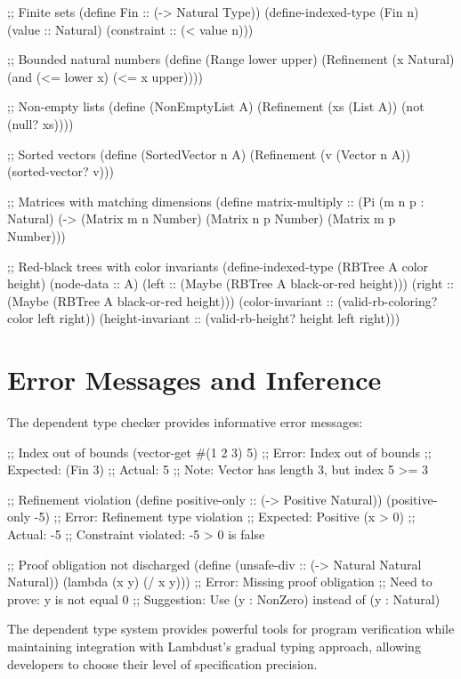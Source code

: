 \begin{example}
\begin{lambdustcode}
;; Finite sets
(define Fin :: (-> Natural Type))
(define-indexed-type (Fin n)
  (value :: Natural)
  (constraint :: (< value n)))

;; Bounded natural numbers  
(define (Range lower upper) 
  (Refinement (x Natural) (and (<= lower x) (<= x upper))))

;; Non-empty lists
(define (NonEmptyList A)
  (Refinement (xs (List A)) (not (null? xs))))

;; Sorted vectors
(define (SortedVector n A)
  (Refinement (v (Vector n A)) (sorted-vector? v)))

;; Matrices with matching dimensions
(define matrix-multiply :: (Pi (m n p : Natural) 
                              (-> (Matrix m n Number) 
                                  (Matrix n p Number) 
                                  (Matrix m p Number)))

;; Red-black trees with color invariants
(define-indexed-type (RBTree A color height)
  (node-data :: A)  
  (left :: (Maybe (RBTree A black-or-red height)))
  (right :: (Maybe (RBTree A black-or-red height)))
  (color-invariant :: (valid-rb-coloring? color left right))
  (height-invariant :: (valid-rb-height? height left right)))
\end{lambdustcode}
\end{example}

\section{Error Messages and Inference}
\label{sec:dependent-errors}

The dependent type checker provides informative error messages:

\begin{example}
\begin{lambdustcode}
;; Index out of bounds
(vector-get #(1 2 3) 5)
;; Error: Index out of bounds
;; Expected: (Fin 3)  
;; Actual: 5
;; Note: Vector has length 3, but index 5 >= 3

;; Refinement violation
(define positive-only :: (-> Positive Natural))
(positive-only -5)
;; Error: Refinement type violation
;; Expected: Positive (x > 0)
;; Actual: -5  
;; Constraint violated: -5 > 0 is false

;; Proof obligation not discharged
(define (unsafe-div :: (-> Natural Natural Natural))
  (lambda (x y) (/ x y)))
;; Error: Missing proof obligation
;; Need to prove: y is not equal 0
;; Suggestion: Use (y : NonZero) instead of (y : Natural)
\end{lambdustcode}
\end{example}

The dependent type system provides powerful tools for program verification while maintaining integration with Lambdust's gradual typing approach, allowing developers to choose their level of specification precision.